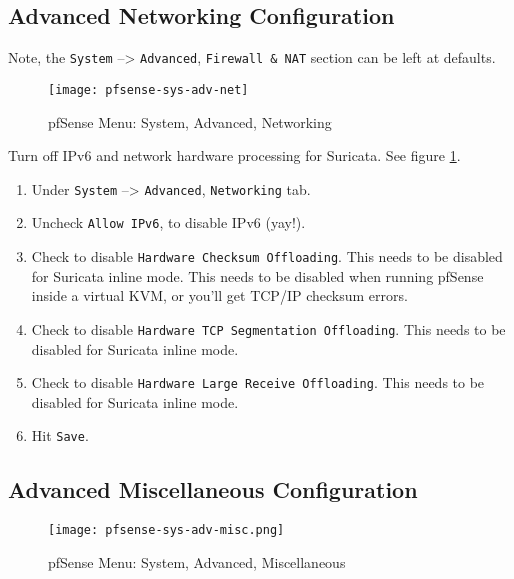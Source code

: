 \subsection{Advanced Networking Configuration}
Note, the \texttt{System} --> \texttt{Advanced}, \texttt{Firewall \& NAT} section can be left at defaults.

\begin{figure}[h!]
\begin{center}
\texttt{[image: pfsense-sys-adv-net]}
 \caption{pfSense Menu: System, Advanced, Networking}
 \label{fig:pfsense-sys-adv-net}
\end{center}
\end{figure}

Turn off IPv6 and network hardware processing for Suricata.
See figure \ref{fig:pfsense-sys-adv-net}.

\begin{enumerate}
 \item Under \texttt{System} --> \texttt{Advanced}, \texttt{Networking} tab.
 \item Uncheck \texttt{Allow IPv6}, to disable IPv6 (yay!).
 \item Check to disable \texttt{Hardware Checksum Offloading}. This needs to be disabled for Suricata inline mode. This needs to be disabled when running pfSense inside a virtual KVM, or you'll get TCP/IP checksum errors.
 \item Check to disable \texttt{Hardware TCP Segmentation Offloading}. This needs to be disabled for Suricata inline mode.
 \item Check to disable \texttt{Hardware Large Receive Offloading}. This needs to be disabled for Suricata inline mode.
 \item Hit \texttt{Save}.
\end{enumerate}

\subsection{Advanced Miscellaneous Configuration}
\begin{figure}[h!]
\begin{center}
\texttt{[image: pfsense-sys-adv-misc.png]}
 \caption{pfSense Menu: System, Advanced, Miscellaneous}
 \label{fig:pfsense-sys-adv-misc}
\end{center}
\end{figure}

